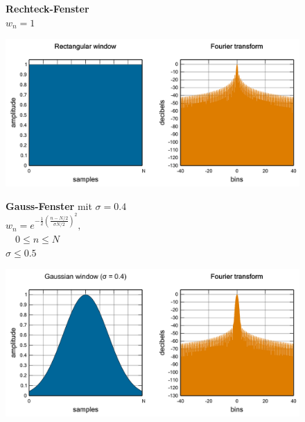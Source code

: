 \begin{figure}
	\begin{minipage}{.4\columnwidth}
		\textbf{Rechteck-Fenster}\\
		$w_{n}=1$
	\end{minipage}%
	\begin{minipage}{.6\columnwidth}
		\centering
		\includegraphics[width=\linewidth]{papers/autotune/sections/fft/images/windows/Rectangular.pdf}
	\end{minipage}


	\begin{minipage}{.4\columnwidth}
		\textbf{Gauss-Fenster} mit $\sigma = 0.4$\\
		$w_{n}=e^{-\frac{1}{2}\left(\frac{n-N / 2}{\sigma N / 2}\right)^{2}},$\\
		$ \quad 0 \leq n \leq N$\\
		$\sigma \leq 0.5$
	\end{minipage}%
	\begin{minipage}{.6\columnwidth}
		\centering
		\includegraphics[width=\linewidth]{papers/autotune/sections/fft/images/windows/Gauss.pdf}
	\end{minipage}



\end{figure}
